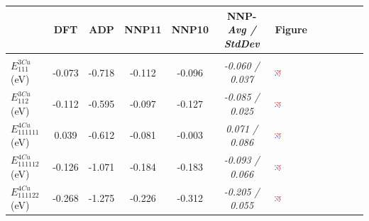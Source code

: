 \documentclass{article}
\begin{document}
%

\begin{table}[H]
\begin{tabular}{l|cccccV}%
\hline%
&DFT&ADP&NNP11& NNP10& NNP-\emph{Avg / StdDev} & Figure \\%
\hline%
\hline%
&&&&&& \\
$E^{3Cu}_{111}$ (eV)&-0.073&{-}0.718&{-}0.112& -0.096 &\emph{-0.060 / 0.037}  & \includegraphics[width=0.07\textwidth]{figures/SoluteCluster_111.png}  \\%
$E^{3Cu}_{112}$ (eV)&-0.112&{-}0.595&{-}0.097& -0.127 &\emph{-0.085 / 0.025}  &  \includegraphics[width=0.07\textwidth]{figures/SoluteCluster_112.png}\\%
$E^{4Cu}_{111111}$(eV)&0.039&{-}0.612&{-}0.081& -0.003 &\emph{0.071 / 0.086}  &  \includegraphics[width=0.07\textwidth]{figures/SoluteCluster_111111.png}\\%
$E^{4Cu}_{111112}$(eV)&-0.126&{-}1.071&{-}0.184& -0.183 &\emph{-0.093 / 0.066}& \includegraphics[width=0.07\textwidth]{figures/SoluteCluster_111112.png} \\%
$E^{4Cu}_{111122}$(eV)&-0.268&{-}1.275&{-}0.226& -0.312 &\emph{-0.205 / 0.055}&  \includegraphics[width=0.07\textwidth]{figures/SoluteCluster_111122.png}\\%

\end{tabular}
\end{table}
\end{document}
